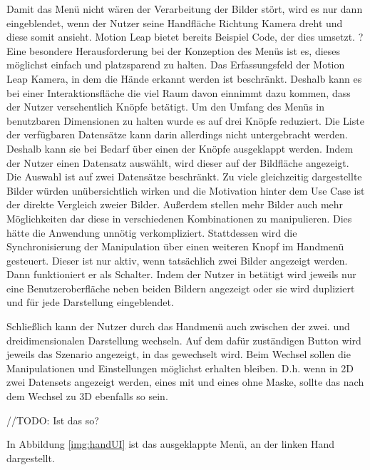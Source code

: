 Damit das Menü nicht wären der Verarbeitung der Bilder stört, wird es nur dann eingeblendet, wenn der Nutzer seine Handfläche Richtung Kamera dreht und diese somit ansieht. Motion Leap bietet bereits Beispiel Code, der dies umsetzt. ?
Eine besondere Herausforderung bei der Konzeption des Menüs ist es, dieses möglichst einfach und platzsparend zu halten. Das Erfassungsfeld der Motion Leap Kamera, in dem die Hände erkannt werden ist beschränkt. Deshalb kann es bei einer Interaktionsfläche die viel Raum davon einnimmt dazu kommen, dass der Nutzer versehentlich Knöpfe betätigt. 
Um den Umfang des Menüs in benutzbaren Dimensionen zu halten wurde es auf drei Knöpfe reduziert. 
Die Liste der verfügbaren Datensätze kann darin allerdings nicht untergebracht werden. Deshalb kann sie bei Bedarf über einen der Knöpfe ausgeklappt werden. 
Indem der Nutzer einen Datensatz auswählt, wird dieser auf der Bildfläche angezeigt. Die Auswahl ist auf zwei Datensätze beschränkt. Zu viele gleichzeitig dargestellte Bilder würden unübersichtlich wirken und die Motivation hinter dem Use Case ist der direkte Vergleich zweier Bilder. Außerdem stellen mehr Bilder auch mehr Möglichkeiten dar diese in verschiedenen Kombinationen zu manipulieren. Dies hätte die Anwendung unnötig verkompliziert. 
Stattdessen wird die Synchronisierung der Manipulation über einen weiteren Knopf im Handmenü gesteuert. Dieser ist nur aktiv, wenn tatsächlich zwei Bilder angezeigt werden. Dann funktioniert er als Schalter. Indem der Nutzer in betätigt wird jeweils nur eine Benutzeroberfläche neben beiden Bildern angezeigt oder sie wird dupliziert und für jede Darstellung eingeblendet. 
 
Schließlich kann der Nutzer durch das Handmenü auch zwischen der zwei. und dreidimensionalen Darstellung wechseln. Auf dem dafür zuständigen Button wird jeweils das Szenario angezeigt, in das gewechselt wird.
Beim Wechsel sollen die Manipulationen und Einstellungen möglichst erhalten bleiben. D.h. wenn in 2D zwei Datensets angezeigt werden, eines mit und eines ohne Maske, sollte das nach dem Wechsel zu 3D ebenfalls so sein. 

//TODO: Ist das so?

In Abbildung \ref{img:handUI} ist das ausgeklappte Menü, an der linken Hand dargestellt.

